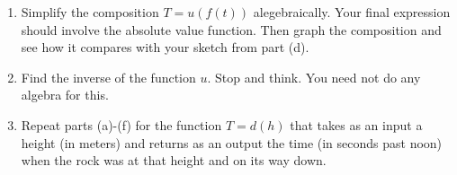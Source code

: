 \documentclass{ximera}
\begin{document}
\begin{question}
\begin{enumerate}
\item Simplify the composition $T=u(f(t))$ alegebraically. Your final expression should involve the absolute value function. Then graph the composition and see how it compares with your sketch from part (d).  %

\item Find the inverse of the function $u$. Stop and think. You need not do any algebra for this.

\item Repeat parts (a)-(f) for the function $T=d(h)$ that takes as an input a height (in meters) and returns as an output the time (in seconds past noon) when the rock was at that height and on its way down.
\end{enumerate}
\end{question}
\end{document}
